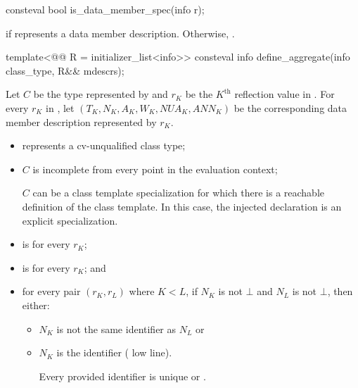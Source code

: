 %
\begin{itemdecl}
consteval bool is_data_member_spec(info r);
\end{itemdecl}

\begin{itemdescr}
\pnum
\returns
{} if  represents a data member description.
Otherwise, .
\end{itemdescr}

%
\begin{itemdecl}
template<@@ R = initializer_list<info>>
  consteval info define_aggregate(info class_type, R&& mdescrs);
\end{itemdecl}

\begin{itemdescr}
\pnum
Let $C$ be the type represented by 
and $r_K$ be the $K^\text{th}$ reflection value in .
For every $r_K$ in ,
let $(T_K, N_K, A_K, W_K, \mathit{NUA}_K, \mathit{ANN}_K)$ be
the corresponding data member description represented by $r_K$.

\pnum
\constantwhen
\begin{itemize}
\item
   represents a cv-unqualified class type;
\item
  $C$ is incomplete from every point in the evaluation context;
  \begin{note}
  $C$ can be a class template specialization
  for which there is a reachable definition of the class template.
  In this case,
  the injected declaration is an explicit specialization.
  \end{note}
\item
   is  for every $r_K$;
\item
   is  for every $r_K$; and
\item
  for every pair $(r_K, r_L)$ where $K < L$,
  if $N_K$ is not $\bot$ and $N_L$ is not $\bot$,
  then either:
  \begin{itemize}
  \item
    $N_K$ is not the same identifier as $N_L$ or
  \item
    $N_K$ is the identifier \tcode{_} ( low line).
    \begin{note}
    Every provided identifier is unique or .
    \end{note}
  \end{itemize}
\end{itemize}


\end{itemdescr}
